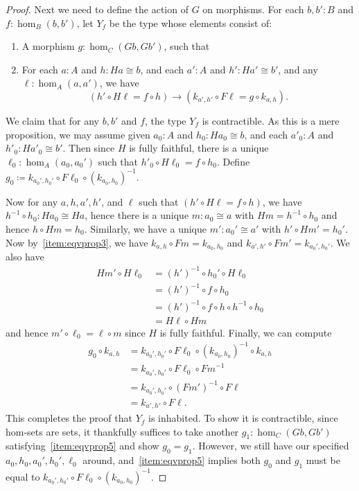 \documentclass{mscs}
\newcommand{\defeq}{\coloneqq}  %
\numberwithin{equation}{section}
\newcommand{\inv}[1]{{#1}^{-1}}
\begin{document}
\begin{proof}
  Next we need to define the action of $G$ on morphisms.
  For each $b,b':B$ and $f:\hom_B(b,b')$, let $Y_f$ be the type whose elements consist of:
  \begin{enumerate}[resume]
  \item A morphism $g:\hom_C(Gb,Gb')$, such that
  \item For each $a:A$ and $h:Ha\cong b$, and each $a':A$ and $h':Ha'\cong b'$, and any $\ell:\hom_A(a,a')$, we have\label{item:eqvprop5}
    \[ (h' \circ H\ell = f \circ h)
    \to
    (k_{a',h'} \circ F\ell = g\circ k_{a,h}). \]
  \end{enumerate}
  We claim that for any $b,b'$ and $f$, the type $Y_f$ is contractible.
  As this is a mere proposition, we may assume given $a_0:A$ and $h_0:Ha_0\cong b$, and each $a'_0:A$ and $h'_0:Ha'_0\cong b'$.
  Then since $H$ is fully faithful, there is a unique $\ell_0:\hom_A(a_0,a_0')$ such that $h'_0 \circ H\ell_0 = f \circ h_0$.
  Define $g_0 \defeq k_{a_0',h_0'} \circ F \ell_0 \circ \inv{(k_{a_0,h_0})}$.

  Now for any $a,h,a',h'$, and $\ell$ such that $(h' \circ H\ell = f \circ h)$, we have $\inv{h}\circ h_0:Ha_0\cong Ha$, hence there is a unique $m:a_0\cong a$ with $Hm = \inv{h}\circ h_0$ and hence $h\circ Hm = h_0$.
  Similarly, we have a unique $m':a_0'\cong a'$ with $h'\circ Hm' = h_0'$.
  Now by~\ref{item:eqvprop3}, we have $k_{a,h}\circ Fm = k_{a_0,h_0}$ and $k_{a',h'}\circ Fm' = k_{a_0',h_0'}$.
  We also have
  \begin{align*}
    Hm' \circ H\ell_0
    &= \inv{(h')} \circ h_0' \circ H\ell_0\\
    &= \inv{(h')} \circ f \circ h_0\\
    &= \inv{(h')} \circ f \circ h \circ \inv{h} \circ h_0\\
    &= H\ell \circ Hm
  \end{align*}
  and hence $m'\circ \ell_0 = \ell\circ m$ since $H$ is fully faithful.
  Finally, we can compute
  \begin{align*}
    g_0 \circ k_{a,h}
    &= k_{a_0',h_0'} \circ F \ell_0 \circ \inv{(k_{a_0,h_0})} \circ k_{a,h}\\
    &= k_{a_0',h_0'} \circ F \ell_0 \circ \inv{Fm}\\
    &= k_{a_0',h_0'} \circ \inv{(Fm')} \circ F\ell\\
    &= k_{a',h'}\circ F\ell.
  \end{align*}
  This completes the proof that $Y_f$ is inhabited.
  To show it is contractible, since hom-sets are sets, it thankfully suffices to take another $g_1:\hom_C(Gb,Gb')$ satisfying~\ref{item:eqvprop5} and show $g_0=g_1$.
  However, we still have our specified $a_0,h_0,a_0',h_0',\ell_0$ around, and~\ref{item:eqvprop5} implies both $g_0$ and $g_1$ must be equal to $k_{a_0',h_0'} \circ F \ell_0 \circ \inv{(k_{a_0,h_0})}$.


\end{proof}
\end{document}
